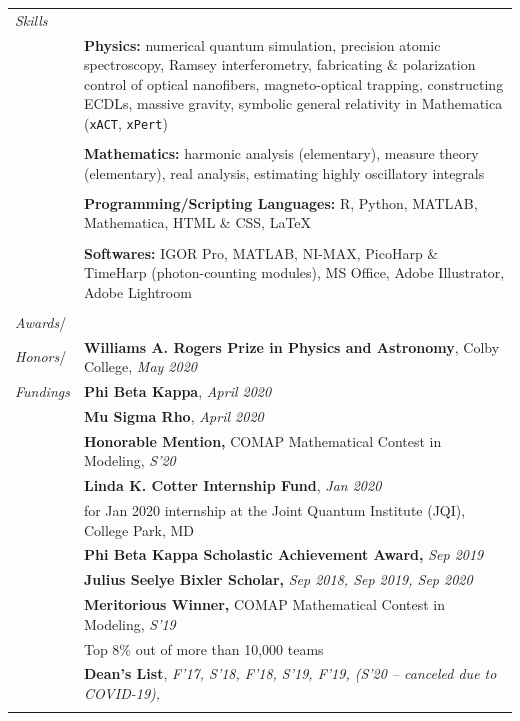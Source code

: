 \documentclass[10pt]{article}
\begin{document}
\begin{longtable}{ l p{15cm}   }
  
     				 	 
  
  
  						 
  						 
\large{\textit{Skills}}      	& \\ 
  						& \textbf{Physics:} numerical quantum simulation, precision atomic spectroscopy, Ramsey interferometry, fabricating \& polarization control of optical nanofibers, magneto-optical trapping, constructing ECDLs, massive gravity, symbolic general relativity in Mathematica (\texttt{xACT}, \texttt{xPert})  \\ 
  						& \\
  						& \textbf{Mathematics:} harmonic analysis (elementary), measure theory (elementary), real analysis, estimating highly oscillatory integrals\\
  						& \\
  						& \textbf{Programming/Scripting Languages:} R, Python, MATLAB, Mathematica, HTML \& CSS, \LaTeX{}\\
  						& \\
  						& \textbf{Softwares:} IGOR Pro, MATLAB, NI-MAX, PicoHarp \& TimeHarp (photon-counting modules), MS Office,  Adobe Illustrator, Adobe Lightroom\\ 
  						& \\
  						
  						
 
 \large{\textit{Awards}/}    	& \\
 \large{\textit{Honors}/}		& \textbf{Williams A. Rogers Prize in Physics and Astronomy}, Colby College, \textit{May 2020} \\
 \large{\textit{Fundings}}	& \textbf{Phi Beta Kappa}, \textit{April 2020} \\
 & \textbf{Mu Sigma Rho}, \textit{April 2020}\\
 & \textbf{Honorable Mention,}  COMAP Mathematical Contest in Modeling, \textit{S'20}\\
 & \textbf{Linda K. Cotter Internship Fund}, \textit{Jan 2020}\\
 & for Jan 2020 internship at the Joint Quantum Institute (JQI), College Park, MD\\
 & \textbf{Phi Beta Kappa Scholastic Achievement Award,} \textit{Sep 2019}\\
 & \textbf{Julius Seelye Bixler Scholar,} \textit{Sep 2018, Sep 2019, Sep 2020}\\
 & \textbf{Meritorious Winner,}  COMAP Mathematical Contest in Modeling, \textit{S'19}\\
 & Top 8\% out of more than 10,000 teams\\
 & \textbf{Dean’s List}, \textit{F'17, S'18, F'18, S'19, F'19, (S'20 -- canceled due to COVID-19), }\\
 &\\
 

\end{longtable}
\end{document}
